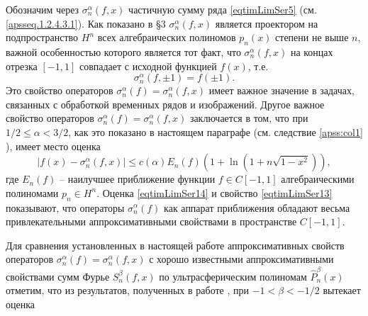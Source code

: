 Обозначим через $\sigma_n^\alpha(f,x)$
частичную сумму ряда \eqref{eqtimLimSer5} (см.\eqref{apsseq.1.2.4.3.1}). Как показано в \S 3 $\sigma_n^\alpha(f,x)$ является проектором на подпространство $H^n$ всех алгебраических полиномов $p_n(x)$ степени не выше $n$, важной особенностью которого является тот факт, что $\sigma_n^\alpha(f,x)$
на концах отрезка $[-1,1]$ совпадает с исходной функцией $f(x)$, т.е.
\begin{equation}\label{eqtimLimSer13}
\sigma_n^\alpha(f,\pm1)=f(\pm1).
\end{equation}
Это свойство операторов $\sigma_n^\alpha(f)=\sigma_n^\alpha(f,x)$ имеет важное значение в задачах, связанных с обработкой временных рядов и изображений.  Другое важное свойство операторов $\sigma_n^\alpha(f)=\sigma_n^\alpha(f,x)$ заключается в том, что при $1/2\le \alpha <3/2$, как это показано в настоящем параграфе (см. следствие \ref{apss:col1} ), имеет место оценка
\begin{equation}\label{eqtimLimSer14}%
|f(x)-\sigma_n^\alpha(f,x)|\le c(\alpha)E_n(f)(1+\ln(1+n\sqrt{1-x^2})),
\end{equation}
где $E_n(f)$ -- наилучшее приближение функции $f\in C[-1,1]$ алгебраическими полиномами\emph{} $p_n\in H^n$. Оценка \eqref{eqtimLimSer14} и свойство \eqref{eqtimLimSer13}  показывают, что операторы $\sigma_n^\alpha(f)$ как
аппарат приближения обладают весьма привлекательными аппроксимативными свойствами в пространстве $C[-1,1]$.

Для сравнения установленных в настоящей работе аппроксимативных свойств операторов  $\sigma_n^\alpha(f)=\sigma_n^\alpha(f,x)$ с хорошо известными аппроксимативными свойствами сумм Фурье $S_n^\beta(f,x)$ по ультрасферическим полиномам $\hat P_n^\beta(x)$  отметим, что из результатов, полученных в работе \cite{badCow}, при $-1<\beta<-1/2$ вытекает оценка

